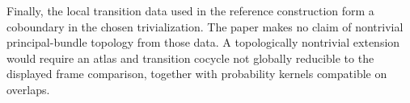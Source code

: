 Finally, the local transition data used in the reference construction form a coboundary in the chosen trivialization. The paper makes no claim of nontrivial principal-bundle topology from those data. A topologically nontrivial extension would require an atlas and transition cocycle not globally reducible to the displayed frame comparison, together with probability kernels compatible on overlaps.
